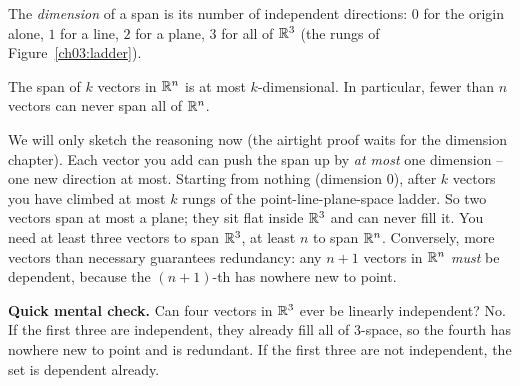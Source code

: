The \emph{dimension} of a span is its number of independent directions: $0$ for the origin alone, $1$ for a line, $2$ for a plane, $3$ for all of $\mathbb{R}^3$ (the rungs of Figure~\ref{ch03:ladder}).

\begin{proposition}\label{ch03:prop-too-few}
The span of $k$ vectors in $\mathbb{R}^n$ is at most $k$-dimensional. In particular, fewer than $n$ vectors can never span all of $\mathbb{R}^n$.
\end{proposition}

We will only sketch the reasoning now (the airtight proof waits for the dimension chapter). Each vector you add can push the span up by \emph{at most} one dimension -- one new direction at most. Starting from nothing (dimension $0$), after $k$ vectors you have climbed at most $k$ rungs of the point-line-plane-space ladder. So two vectors span at most a plane; they sit flat inside $\mathbb{R}^3$ and can never fill it. You need at least three vectors to span $\mathbb{R}^3$, at least $n$ to span $\mathbb{R}^n$. Conversely, more vectors than necessary guarantees redundancy: any $n+1$ vectors in $\mathbb{R}^n$ \emph{must} be dependent, because the $(n{+}1)$-th has nowhere new to point.

\textbf{Quick mental check.} Can four vectors in $\mathbb{R}^3$ ever be linearly independent? No. If the first three are independent, they already fill all of $3$-space, so the fourth has nowhere new to point and is redundant. If the first three are not independent, the set is dependent already.

